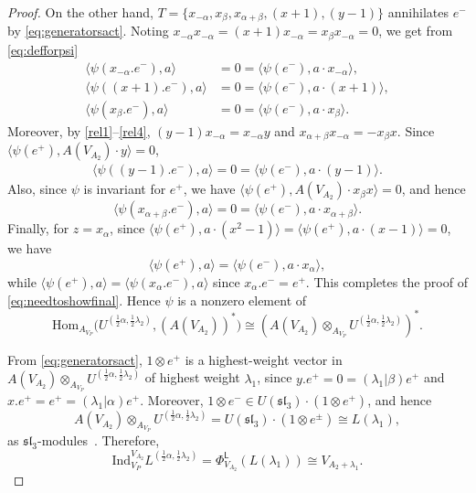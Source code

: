 \documentclass[12pt,a4paper,reqno]{amsart}
\numberwithin{equation}{section}
\numberwithin{equation}{section}
\theoremstyle{definition}
\def \Hom {\mathrm{Hom}}
\def\L{\mathcal{L}}
\def\L{\mathsf{L}}
\def\L{\mathsf{L}}
\begin{document}
\begin{proof}
			
			On the other hand, 
			$T = \{x_{-\alpha}, x_{\beta}, x_{\alpha+\beta}, (x + 1), (y - 1)\}$ annihilates $e^-$ 
			by \eqref{eq:generatorsact}. 
			Noting $x_{-\alpha}x_{-\alpha} = (x + 1)x_{-\alpha} = x_{\beta}x_{-\alpha} = 0$, 
			we get from \eqref{eq:defforpsi}
			\begin{align*}
				\langle \psi(x_{-\alpha}.e^-), a \rangle &= 0 = \langle \psi(e^-), a \cdot x_{-\alpha} \rangle,\\
				\langle \psi((x + 1).e^-), a \rangle &= 0 = \langle \psi(e^-), a \cdot (x + 1) \rangle,\\
				\langle \psi(x_{\beta}.e^-), a \rangle &= 0 = \langle \psi(e^-), a \cdot x_{\beta} \rangle.
			\end{align*}
			Moreover, by \eqref{rel1}--\eqref{rel4}, 
			$(y - 1)x_{-\alpha} = x_{-\alpha}y$ and 
			$x_{\alpha+\beta}x_{-\alpha} = -x_{\beta}x$. 
			Since $\langle \psi(e^+), A(V_{A_2}) \cdot y \rangle = 0$, 
			\begin{align*}
				\langle \psi((y - 1).e^-), a \rangle 
				= 0 
				= \langle \psi(e^-), a \cdot (y - 1) \rangle.
			\end{align*}
			Also, since $\psi$ is invariant for $e^+$, we have 
			$\langle \psi(e^+), A(V_{A_2}) \cdot x_{\beta}x \rangle = 0$, 
			and hence 
			\[
			\langle \psi(x_{\alpha+\beta}.e^-), a \rangle 
			= 0 
			= \langle \psi(e^-), a \cdot x_{\alpha+\beta} \rangle.
			\]
			Finally, for $z = x_{\alpha}$, since 
			$\langle \psi(e^+), a \cdot (x^2 - 1) \rangle 
			= \langle \psi(e^+), a \cdot (x - 1) \rangle = 0$, 
			we have
			\[
			\langle \psi(e^+), a \rangle 
			= \langle \psi(e^-), a \cdot x_{\alpha} \rangle,
			\]
			while $\langle \psi(e^+), a \rangle 
			= \langle \psi(x_{\alpha}.e^-), a \rangle$ 
			since $x_{\alpha}.e^- = e^+$. 
			This completes the proof of \eqref{eq:needtoshowfinal}. 
			Hence $\psi$ is a nonzero element of
			\[
			\Hom_{A_{V_P}}\bigl(U^{(\frac{1}{2}\alpha, \frac{1}{2}\lambda_2)}, 
			(A(V_{A_2}))^{\ast}\bigr)
			\cong 
			\left(A(V_{A_2}) \otimes_{A_{V_P}} 
			U^{(\frac{1}{2}\alpha, \frac{1}{2}\lambda_2)}\right)^{\ast}.
			\]
			
			
			From \eqref{eq:generatorsact}, 
			$1 \otimes e^+$ is a highest-weight vector in 
			$A(V_{A_2}) \otimes_{A_{V_P}} U^{(\frac{1}{2}\alpha, \frac{1}{2}\lambda_2)}$ 
			of highest weight $\lambda_1$, 
			since $y.e^+ = 0 = (\lambda_1 | \beta)e^+$ and 
			$x.e^+ = e^+ = (\lambda_1 | \alpha)e^+$. 
			Moreover, $1 \otimes e^- \in U(\mathfrak{sl}_3) \cdot (1 \otimes e^+)$, 
			and hence 
			\[
			A(V_{A_2}) \otimes_{A_{V_P}} U^{(\frac{1}{2}\alpha, \frac{1}{2}\lambda_2)} 
			= U(\mathfrak{sl}_3) \cdot (1 \otimes e^{\pm}) 
			\cong L(\lambda_1),
			\]
			as $\mathfrak{sl}_3$-modules~\cite{V68}. 
			Therefore,
			\[
			\mathrm{Ind}^{V_{A_2}}_{V_P} L^{(\frac{1}{2}\alpha, \frac{1}{2}\lambda_2)} 
			= \Phi^\L_{V_{A_2}}(L(\lambda_1)) 
			\cong V_{A_2 + \lambda_1}.
			\]
			

\end{proof}
\end{document}
